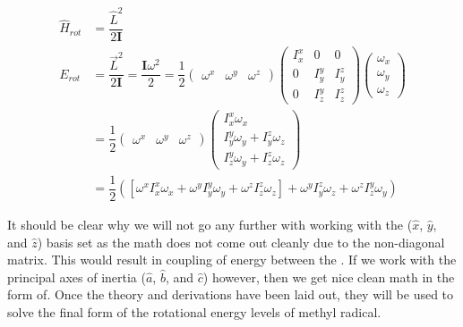 \documentclass[11pt,a4paper]{book}
\begin{document}
			\begin{equation*}
				\label{eq:rotational energy carteisan}
				\begin{split}
				\hat{H}_{rot} &= \dfrac{\hat{L}^2}{2\textbf{I}} \\
				E_{rot} &=\dfrac{\vec{L}^2}{2\textbf{I}} 
				=\dfrac{\textbf{I}\omega^2}{2}
				=\dfrac{1}{2}
				\begin{pmatrix}
					\omega^x &	\omega^y & \omega^z
				\end{pmatrix}
				\begin{pmatrix}
					I_x^x & 0 & 0  \\
					0 & I_y^y & I_y^z\\
					0 & I_z^y & I_z^z
				\end{pmatrix} 						
				\begin{pmatrix}
				 \omega_x\\
				 \omega_y\\
				 \omega_z
				\end{pmatrix}\\
				& = \dfrac{1}{2} 
				\begin{pmatrix}
					\omega^x &	\omega^y & \omega^z
				\end{pmatrix}
				\begin{pmatrix}
					I_x^x\omega_x  \\
					I_y^y\omega_y + I_y^z\omega_z\\
					I_z^y\omega_y + I_z^z\omega_z
				\end{pmatrix} 			\\	
				& = \dfrac{1}{2}
				\left( 
					\left[
					\omega^xI_x^x\omega_x + \omega^yI_y^y\omega_y + 	\omega^zI_z^z\omega_z
					\right] 
					+ \omega^yI_y^z \omega_z + \omega^zI_z^y\omega_y
				\right)
				\end{split}
			\end{equation*}
			
			\noindent
			It should be clear why we will not go any further with working with the ($\hat{x}$, $\hat{y}$, and  $\hat{z}$) basis set as the math does not come out cleanly due to the non-diagonal matrix. This would result in coupling of energy between the . If we work with the principal axes of inertia ($\hat{a}$, $\hat{b}$, and  $\hat{c}$) however, then we get nice clean math in the form of. Once the theory and derivations have been laid out, they will be used to solve the final form of the rotational energy levels of methyl radical.
			
\end{document}
